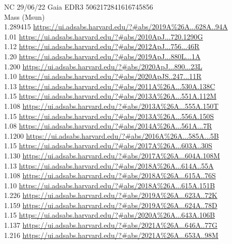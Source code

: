 NC 29/06/22
Gaia EDR3 5062172841616745856\\

Mass (Msun)\\
1.289415 \url{https://ui.adsabs.harvard.edu/?#abs/2019A%26A...628A..94A}\\
1.01 \url{https://ui.adsabs.harvard.edu/?#abs/2010ApJ...720.1290G}\\
1.12 \url{https://ui.adsabs.harvard.edu/?#abs/2012ApJ...756...46R}\\
1.20 \url{https://ui.adsabs.harvard.edu/?#abs/2019ApJ...880L...1A}\\
1.200 \url{https://ui.adsabs.harvard.edu/?#abs/2020ApJ...890...23L}\\
1.10 \url{https://ui.adsabs.harvard.edu/?#abs/2020ApJS..247...11R}\\
1.13 \url{https://ui.adsabs.harvard.edu/?#abs/2011A%26A...530A.138C}\\
1.15 \url{https://ui.adsabs.harvard.edu/?#abs/2013A%26A...551A.112M}\\
1.108 \url{https://ui.adsabs.harvard.edu/?#abs/2013A%26A...555A.150T}\\
1.15 \url{https://ui.adsabs.harvard.edu/?#abs/2013A%26A...556A.150S}\\
1.08 \url{https://ui.adsabs.harvard.edu/?#abs/2014A%26A...561A...7R}\\
1.1200 \url{https://ui.adsabs.harvard.edu/?#abs/2016A%26A...585A...5B}\\
1.15 \url{https://ui.adsabs.harvard.edu/?#abs/2017A%26A...603A..30S}\\
1.130 \url{https://ui.adsabs.harvard.edu/?#abs/2017A%26A...604A.108M}\\
1.13 \url{https://ui.adsabs.harvard.edu/?#abs/2018A%26A...614A..55A}\\
1.108 \url{https://ui.adsabs.harvard.edu/?#abs/2018A%26A...615A..76S}\\
1.10 \url{https://ui.adsabs.harvard.edu/?#abs/2018A%26A...615A.151B}\\
1.226 \url{https://ui.adsabs.harvard.edu/?#abs/2019A%26A...623A..72K}\\
1.159 \url{https://ui.adsabs.harvard.edu/?#abs/2019A%26A...624A..78D}\\
1.15 \url{https://ui.adsabs.harvard.edu/?#abs/2020A%26A...643A.106B}\\
1.137 \url{https://ui.adsabs.harvard.edu/?#abs/2021A%26A...646A..77G}\\
1.216 \url{https://ui.adsabs.harvard.edu/?#abs/2021A%26A...653A..98M}\\
